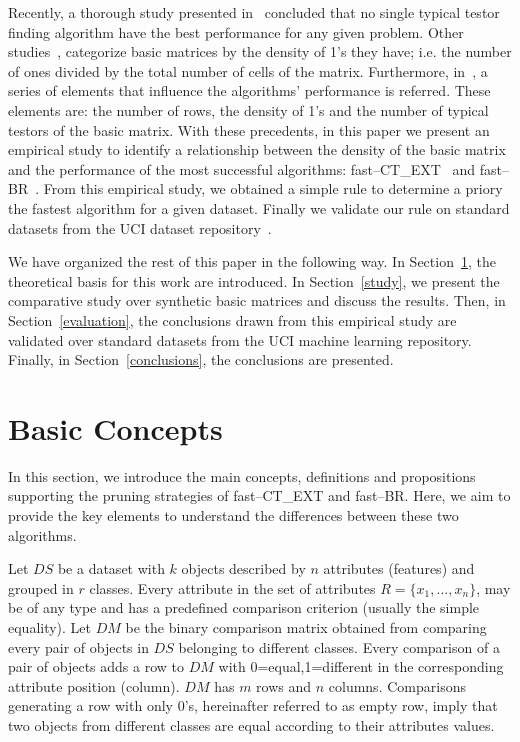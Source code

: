 \documentclass[citenumber]{llncs}
\begin{document}
	Recently, a thorough study presented in~\cite{Alba13} concluded that no single typical testor finding algorithm have the best performance for any given problem. Other studies~\cite{Lias2013,Rodriguez15}, categorize basic matrices by the density of 1's they have; i.e. the number of ones divided by the total number of cells of the matrix. Furthermore, in~\cite{Gonzalez15},  a series of elements that influence the algorithms' performance is referred. These elements are: the number of rows, the density of 1's and the number of typical testors of the basic matrix. With these precedents, in this paper we present an empirical study to identify a relationship between the density of the basic matrix and the performance of the most successful algorithms: fast--CT\_EXT~\cite{Sanchez2010} and fast--BR~\cite{Lias2013}. From this empirical study, we obtained a simple rule to determine a priory the fastest algorithm for a given dataset. Finally we validate our rule on standard datasets from the UCI dataset repository~\cite{Bache13}. 
	
	We have organized the rest of this paper in the following way. In Section~\ref{basic_conctps}, the theoretical basis for this work are introduced. In Section~\ref{study}, we present the comparative study over synthetic basic matrices and discuss the results. Then, in Section~\ref{evaluation}, the conclusions drawn from this empirical study are validated over standard datasets from the UCI machine learning repository. Finally, in Section~\ref{conclusions}, the conclusions are presented.
%
\section{Basic Concepts} \label{basic_conctps}
%
	In this section, we introduce the main concepts, definitions and propositions supporting the pruning strategies of fast--CT\_EXT and fast--BR. Here, we aim to provide the key elements to understand the differences between these two algorithms. 
	
	Let $DS$ be a dataset with $k$ objects described by $n$ attributes (features) and grouped in $r$ classes. Every attribute in the set of attributes $R=\lbrace x_1,...,x_n \rbrace$, may be of any type and has a predefined comparison criterion (usually the simple equality). Let $DM$ be the binary comparison matrix obtained from comparing every pair of objects in $DS$ belonging to different classes. Every comparison of a pair of objects adds a row to $DM$ with 0=equal,1=different in the corresponding attribute position (column). $DM$ has $m$ rows and $n$ columns. Comparisons generating a row with only 0's, hereinafter referred to as empty row, imply that two objects from different classes are equal according to their attributes values. 
	
\end{document}
